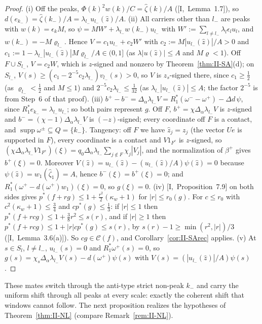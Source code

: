 \documentclass[10pt]{amsart}
\theoremstyle{definition}
\theoremstyle{remark}
\newcommand{\supp}{\operatorname{supp}}
\newcommand{\Cset}{\mathcal C}
\newcommand{\zh}{\hat z}
\begin{document}
\begin{proof}
(i) Off the peaks, $\Phi(k)^2w(k)/C=\hat\zeta(k)/A$ ([I,~Lemma~1.7]), so $d(e_{k_-})
=\hat\zeta(k_-)/A=\lambda_{l_-}u_{l_-}(\zh)/A$.  (ii) All carriers other than $l_-$
are peaks with $w(k)=\epsilon_kM$, so $\psi=MW'+\lambda_{l_-}w(k_-)u_{l_-}$ with
$W':=\sum_{l\ne l_-}\lambda_l\epsilon_lu_l$, and $w(k_-)=-M\varrho_{l_-}$.  Hence
$V=c_1u_{l_-}+c_2W'$ with $c_2:=M|u_{l_-}(\zh)|/A>0$ and $c_1:=1-\lambda_{l_-}
|u_{l_-}(\zh)|M\varrho_{l_-}/A\in(0,1]$ (as $\lambda|u(\zh)|\le A$ and $M\varrho<1$).
Off $F\cup S_{l_-}$, $V=c_2W$, which is $z$-signed and nonzero by
Theorem~\ref{thm:II-SA}(d); on $S_{l_-}$, $V(s)\ge(c_1-2^{-5}c_2\lambda_{l_-})
v_{l_-}(s)>0$, so $V$ is $z_s$-signed there, since $c_1\ge\frac12$ (as
$\varrho_{l_-}<\frac12$ and $M\le1$) and $2^{-5}c_2\lambda_{l_-}\le\frac1{32}$
(as $\lambda_{l_-}|u_{l_-}(\zh)|\le A$; the factor $2^{-5}$ is from Step~6 of
that proof).  (iii)
$b^+-b^-=\Delta_\alpha\lambda_{l_-}V=R_1^*(\omega^--\omega^+)-\Delta d\,\psi$, since
$R_1^*e_{k_-}=\lambda_{l_-}u_{l_-}$; so both pairs represent $g$.  Off $F$,
$b^+=\chi\Delta_\alpha\lambda_{l_-}V$ is $z$-signed and $b^-=(\chi-1)\Delta_\alpha
\lambda_{l_-}V$ is $(-z)$-signed; every coordinate off $F$ is a contact, and
$\supp\omega^\pm\subseteq Q=\{k_-\}$.  Tangency: off $F$ we have
$\zh_j=z_j$ (the vector $Ue$ is supported in $F$), every coordinate is a
contact and $V1_{F^c}$ is $z$-signed, so $(\chi\Delta_\alpha\lambda_{l_-}V
1_{F^c})(\xi)=q_0\Delta_\alpha\lambda_{l_-}\sum_{j\notin F}\chi_j|V_j|$, and
the normalization of $\beta^+$ gives $b^+(\xi)=0$.  Moreover $V(\zh)=
u_{l_-}(\zh)-(u_{l_-}(\zh)/A)\psi(\zh)=0$ because $\psi(\zh)=w_1(\hat\zeta_1)=A$,
hence $b^-(\xi)=b^+(\xi)=0$; and $R_1^*(\omega^+-d(\omega^+)w_1)(\xi)=0$, so
$g(\xi)=0$.  (iv) [I,~Proposition~7.9] on both sides
gives $p^*(f+rg)\le1+\frac{r^2}2(\kappa_w+1)$ for $|r|\le r_0(g)$.  For $c\le
r_0$ with $c^2(\kappa_w+1)\le\frac34$ and $cp^*(g)\le\frac13$: if $|r|\le1$ then
$p^*(f+rcg)\le1+\frac38r^2\le s(r)$, and if $|r|\ge1$ then $p^*(f+rcg)\le1+
|r|cp^*(g)\le s(r)$, by $s(r)-1\ge\min(r^2,|r|)/3$ ([I,~Lemma~3.6(a)]).  So
$cg\in\Cset(f)$, and Corollary~\ref{cor:II-SArec} applies.  (v) At $s\in S_l$,
$l\ne l_-$, $u_{l_-}(s)=0$ and $R_1^*\omega^+(s)=0$, so $g(s)=\chi_s\Delta_\alpha
\lambda_{l_-}V(s)-d(\omega^+)\psi(s)$ with $V(s)=(|u_{l_-}(\zh)|/A)\psi(s)$.
\end{proof}

These mates switch through the anti-type strict non-peak $k_-$ and carry
the uniform shift through all peaks at every scale: exactly the coherent
shift that windows cannot follow.  The next proposition realizes the
hypotheses of Theorem~\ref{thm:II-NL} (compare Remark~\ref{rem:II-NL}).
\end{document}

